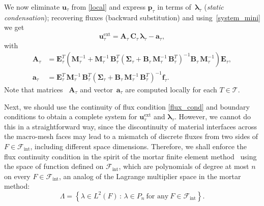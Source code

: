 \documentclass[12pt]{article}
\newcommand{\vect}[1]{\boldsymbol{\mathbf{#1}}}
\newcommand{\bmesh}{{\vect{\mathcal T}}}
\newcommand{\mmesh}{{\vect{\mathcal \tau}}}
\newcommand{\bfaces}[1][]{{\vect{\mathcal F}_{\text{#1}}}}
\begin{document}
We now eliminate ${\vect u}_\mmesh$ from \eqref{local} and express ${\vect p}_\mmesh$ in terms of~${\vect \lambda}_\mmesh$ (\textit{static condensation}); recovering fluxes (backward substitution) and using~\eqref{system_mini} we get
	\begin{equation}\label{mini_flux_dofs}
		{\vect u}^\text{ext}_\mmesh = \vect A_\mmesh\,\vect C_\mmesh\,{\vect \lambda}_\mmesh - {\vect a}_\mmesh,
	\end{equation}
with
	\begin{align} \label{defA}
		\vect A_\mmesh &= \vect E^T_\mmesh \left( \vect M^{-1}_\mmesh + \vect M^{-1}_\mmesh\,\vect B^T_\mmesh \left( \vect \Sigma_\mmesh + \vect B_\mmesh\,\vect M^{-1}_\mmesh\,\vect B^{T}_\mmesh\right)^{-1} \vect B_\mmesh\,\vect M^{-1}_\mmesh \right) \vect E_\mmesh, \\
		{\vect a}_\mmesh &= \vect E^{T}_\mmesh\,\vect M^{-1}_\mmesh\,\vect B^T_\mmesh \left( \vect \Sigma_\mmesh + \vect B_\mmesh\,\vect M^{-1}_\mmesh\,\vect B^{T}_\mmesh\right)^{-1} {\vect f}_\mmesh.
	\end{align}
Note that matrices ~$\vect A_\mmesh$ and vector~${\vect a}_\mmesh$ are computed locally for each $T\in\bmesh$.
\smallskip
		
Next, we should use the continuity of flux condition \eqref{flux_cond} and boundary conditions to obtain a complete system for ${\vect u}^\text{ext}_\mmesh$ and ${\vect \lambda}_\mmesh$. However, we cannot do this in a straightforward way, since the discontinuity of material interfaces across the macro-mesh faces may lead to a mismatch of discrete fluxes from two sides of $F\in\bfaces[int]$, including different space dimensions.
Therefore, we shall enforce the flux continuity condition in the spirit of the mortar finite element method~\cite{mortar} using the space of function defined on $\bfaces[int]$, which are polynomials of degree at most $n$ on every $F\in\bfaces[int]$, an analog of the Lagrange multiplier space in the mortar method:
\[
\Lambda=\left\{\lambda\in L^2(F)\,:\, \lambda\in P_n~\text{for any}~F\in\bfaces[int]\right\}.
\]
\end{document}
